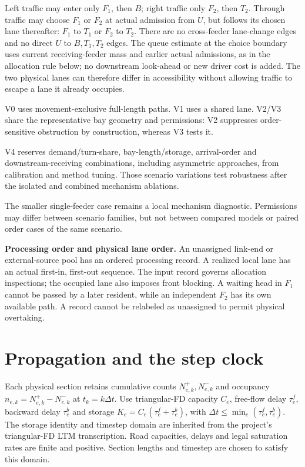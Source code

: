 \documentclass[10pt,a4paper]{article}
\begin{document}
Left traffic may enter only $F_1$, then $B$; right traffic only $F_2$,
then $T_2$. Through traffic may choose $F_1$ or $F_2$ at actual admission
from $U$, but follows its chosen lane thereafter: $F_1$ to $T_1$ or
$F_2$ to $T_2$. There are no cross-feeder lane-change edges and no direct
$U$ to $B,T_1,T_2$ edges. The queue estimate at the choice boundary uses
current receiving-feeder mass and earlier actual admissions, as in the
allocation rule below; no downstream look-ahead or new driver cost is added.
The two physical lanes can therefore differ in accessibility without
allowing traffic to escape a lane it already occupies.

V0 uses movement-exclusive full-length paths. V1 uses a shared lane.
V2/V3 share the representative bay geometry and permissions: V2 suppresses
order-sensitive obstruction by construction, whereas V3 tests it.

V4 reserves demand/turn-share, bay-length/storage, arrival-order and
downstream-receiving combinations, including asymmetric approaches,
from calibration and method tuning. Those scenario variations test
robustness after the isolated and combined mechanism ablations.
\par The smaller single-feeder
case remains a local mechanism diagnostic. Permissions may differ
between scenario families, but not between compared models or paired
order cases of the same scenario.

\textbf{Processing order and physical lane order.}
An unassigned link-end or external-source pool has an ordered processing
record. A realized local lane has an actual first-in, first-out sequence.
The input record governs allocation inspections; the occupied lane also
imposes front blocking. A waiting head in $F_1$ cannot be passed by a
later resident, while an independent $F_2$ has its own available path.
A record cannot be relabeled as unassigned to permit physical overtaking.

\section{Propagation and the step clock}

Each physical section retains cumulative counts $N^+_{e,k},N^-_{e,k}$
and occupancy $n_{e,k}=N^+_{e,k}-N^-_{e,k}$ at $t_k=k\Delta t$.
Use triangular-FD capacity $C_e$, free-flow delay $\tau^f_e$, backward
delay $\tau^b_e$ and storage $K_e=C_e(\tau^f_e+\tau^b_e)$, with
$\Delta t\leq\min_e(\tau^f_e,\tau^b_e)$.
The storage identity and timestep domain are inherited from the project's triangular-FD LTM transcription.
Road capacities, delays and legal saturation rates are finite and positive.
Section lengths and timestep are chosen to satisfy this domain.
\end{document}

